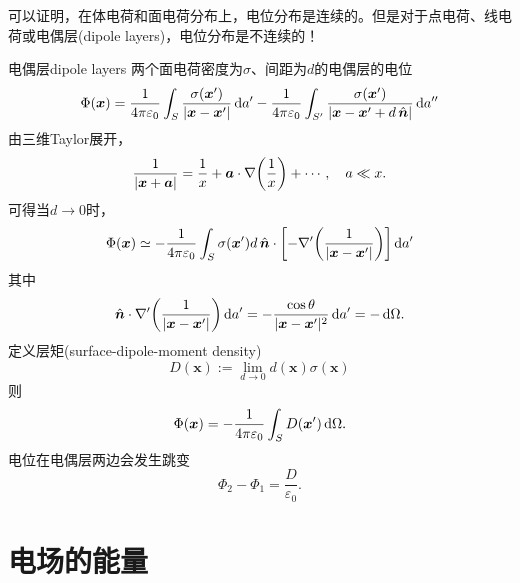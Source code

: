 可以证明，在体电荷和面电荷分布上，电位分布是连续的。但是对于点电荷、线电荷或电偶层(dipole layers)，电位分布是不连续的！
\begin{example}{电偶层}{dipole layers}
    两个面电荷密度为$\sigma$、间距为$d$的电偶层的电位 
    \begin{align*}
        \Phi(\bm x)=\frac1{4\pi\varepsilon_0}\int_S\frac{\sigma(\bm x')}{|\bm x-\bm x'|}\mathop{}\!\mathrm{d} a'-\frac1{4\pi\varepsilon_0}\int_{S'}\frac{\sigma(\bm x')}{|\bm x-\bm x'+d\mathop{}\!\hat{\bm{n}}|}\mathop{}\!\mathrm{d} a''
    \end{align*}
    由三维Taylor展开，
    \[
        \frac1{|\bm x+\bm a|}=\frac1x+\bm a\cdot\nabla\biggl(\frac1x\biggr)+\cdots,\quad a\ll x.
    \]
    可得当$d\to0$时，
    \[
        \Phi(\bm x)\simeq-\frac1{4\pi\varepsilon_0}\int_S\sigma(\bm x')d\mathop{}\!\hat{\bm{n}}\cdot\biggl[-\nabla'\biggl(\frac1{|\bm x-\bm x'|}\biggr)\biggr]\mathop{}\!\mathrm{d} a'
    \]
    其中
    \[
        \mathop{}\!\hat{\bm{n}}\cdot\nabla'\biggl(\frac1{|\bm x-\bm x'|}\biggr)\mathop{}\!\mathrm{d} a'=-\frac{\cos\theta}{|\bm x-\bm x'|^2}\mathop{}\!\mathrm{d} a'=-\mathop{}\!\mathrm{d}\Omega.
    \]
    定义层矩(surface-dipole-moment density) 
    \[
        D(\bm x):=\lim_{d\to 0}d(\bm x)\sigma(\bm x)
    \]
    则
    \begin{equation}
        \Phi(\bm x)=-\frac1{4\pi\varepsilon_0}\int_SD(\bm x')\mathop{}\!\mathrm{d}\Omega.
    \end{equation}
    电位在电偶层两边会发生跳变
    \begin{equation}
        \Phi_2-\Phi_1=\frac D{\varepsilon_0}.
    \end{equation}
\end{example}

\section{电场的能量}

